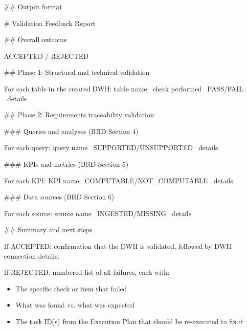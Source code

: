 \#\# Output format
\newline

\# Validation Feedback Report
\newline

\#\# Overall outcome
\newline

ACCEPTED / REJECTED
\newline

\#\# Phase 1: Structural and technical validation
\newline

For each table in the created DWH: table name \textbar\ check performed \textbar\ PASS/FAIL \textbar\ details
\newline

\#\# Phase 2: Requirements traceability validation
\newline

\#\#\# Queries and analyses (BRD Section 4)
\newline

For each query: query name \textbar\ SUPPORTED/UNSUPPORTED \textbar\ details
\newline

\#\#\# KPIs and metrics (BRD Section 5)
\newline

For each KPI: KPI name \textbar\ COMPUTABLE/NOT\_COMPUTABLE \textbar\ details
\newline

\#\#\# Data sources (BRD Section 6)
\newline

For each source: source name \textbar\ INGESTED/MISSING \textbar\ details
\newline

\#\# Summary and next steps
\newline

If ACCEPTED: confirmation that the DWH is validated, followed by DWH connection details.
\newline

If REJECTED: numbered list of all failures, each with:
\begin{itemize}
    \item The specific check or item that failed
    \item What was found vs. what was expected
    \item The task ID(s) from the Execution Plan that should be re-executed to fix it
\end{itemize}

